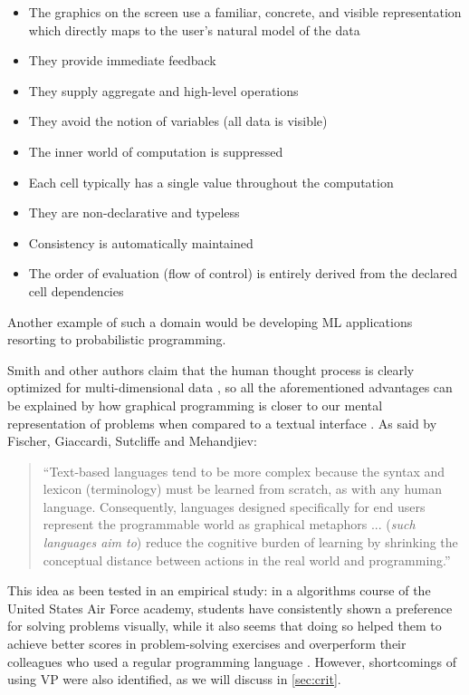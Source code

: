 \begin{itemize}
  \item The graphics on the screen use a familiar, concrete, and visible representation which
directly maps to the user’s natural model of the data
  \item They provide immediate feedback
  \item They supply aggregate and high-level operations
  \item They avoid the notion of variables (all data is visible)
  \item The inner world of computation is suppressed
  \item Each cell typically has a single value throughout the computation
  \item They are non-declarative and typeless
  \item Consistency is automatically maintained
  \item The order of evaluation (flow of control) is entirely derived from the declared cell dependencies
\end{itemize}

Another example of such a domain would be
developing ML applications resorting to probabilistic programming.

Smith and other authors claim that the human thought process is clearly optimized
for multi-dimensional data \cite{smith1977pygmalion}\cite{Clarisse1986},
so all the aforementioned advantages can be explained by how graphical programming is closer
to our mental representation of problems when compared to a textual interface
\cite{Cardellini2002}. As said by Fischer, Giaccardi, Sutcliffe and Mehandjiev:

\begin{quote}
  ``Text-based languages tend to be more complex because the syntax and lexicon
  (terminology) must be learned from scratch, as with any human language.
  Consequently, languages designed specifically for end users represent the
  programmable world as graphical metaphors ... (\textit{such languages aim to}) reduce the cognitive
  burden of learning by shrinking the conceptual distance between actions in
  the real world and programming.'' \cite{G2004}
\end{quote}

This idea as been tested in an empirical study:
in a algorithms course of the United States Air Force academy,
students have consistently shown a preference for solving problems visually,
while it also seems that doing so helped them to achieve better
scores in problem-solving exercises and overperform their colleagues who used
a regular programming language \cite{Cardellini2002}. However, shortcomings of
using VP were also identified, as we will discuss in \ref{sec:crit}.


